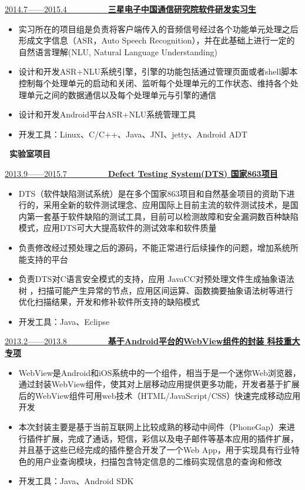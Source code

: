 \documentclass[a4paper,oneside,UTF8, winfonts]{ctexart}
\begin{document}
\uline{2014.7——2015.4~~~~~~~~~~\bf{三星电子中国通信研究院}\hfill \bf{软件研发实习生}}
\begin{itemize}[topsep=0.3em, leftmargin=3pc]
  \setlength{\itemsep}{0pt}
  \setlength{\parsep}{4pt}
  \setlength{\parskip}{4pt}
  \item {}实习所在的项目组是负责将客户端传入的音频信号经过各个功能单元处理之后形成文字信息（ASR，Auto Speech Recognition），并在此基础上进行一定的自然语言理解(NLU, Natural Language Understanding)
  \item {}设计和开发ASR+NLU系统引擎，引擎的功能包括通过管理页面或者shell脚本控制每个处理单元的启动和关闭、监听每个处理单元的工作状态、维持各个处理单元之间的数据通信以及每个处理单元与引擎的通信
  \item {}设计和开发Android平台ASR+NLU系统管理工具
  \item {}开发工具：Linux、C/C++、Java、JNI、jetty、Android ADT
\end{itemize}
\noindent \textbf{ \heiti \faUniversity\ 实验室项目}\par
\vspace{1.2ex}
\uline{2013.9——2015.7~~~~~~~~~~\bf{Defect Testing System(DTS)} \hfill \bf{国家863项目}}
\begin{itemize}[topsep=0.3em, leftmargin=3pc]
  \setlength{\itemsep}{0pt}
  \setlength{\parsep}{4pt}
  \setlength{\parskip}{4pt}
  \item {}DTS（软件缺陷测试系统）是在多个国家863项目和自然基金项目的资助下进行的，采用全新的软件测试理念、应用国际上目前主流的软件测试技术，是国内第一套基于软件缺陷的测试工具，目前可以检测故障和安全漏洞数百种缺陷模式，应用DTS可大大提高软件的测试效率和软件质量
  \item {}负责修改经过预处理之后的源码，不能正常进行后续操作的问题，增加系统所能支持的平台
  \item {}负责DTS对C语言安全模式的支持，应用 JavaCC对预处理文件生成抽象语法树 ，扫描可能产生异常的节点，应用区间运算、函数摘要抽象语法树等进行优化扫描结果，开发和修补软件所支持的缺陷模式
  \item {}开发工具：Java、Eclipse
\end{itemize}\par
\uline{2013.2——2013.8~~~~~~~~~~\bf{基于Android平台的WebView组件的封装} \hfill \bf{科技重大专项}}
\begin{itemize}[topsep=0.3em, leftmargin=3pc]
  \setlength{\itemsep}{0pt}
  \setlength{\parsep}{4pt}
  \setlength{\parskip}{4pt}
  \item {}WebView是Android和iOS系统中的一个组件，相当于是一个迷你Web浏览器，通过封装WebView组件，使其对上层移动应用提供更多功能，开发者基于扩展后的WebView组件可用web技术（HTML/JavaScript/CSS）快速完成移动应用开发
  \item {}本次封装主要是基于当前互联网上比较成熟的移动中间件（PhoneGap）来进行插件扩展，完成了通话，短信，彩信以及电子邮件等基本应用的插件扩展，并且基于这些已经完成的插件整合开发了一个Web App，用于实现具有行业特色的用户业查询模块，扫描包含特定信息的二维码实现信息的查询和修改
  \item {}开发工具：Java、Android SDK
\end{itemize}
\end{document}
